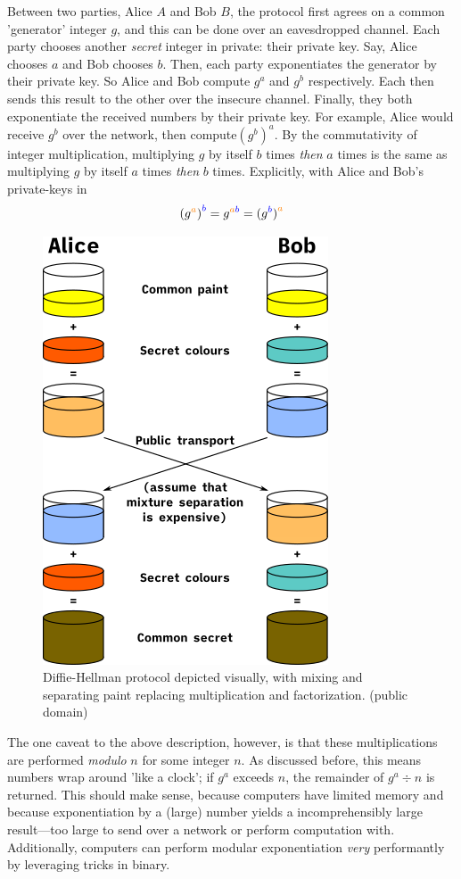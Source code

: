 \documentclass[11pt, a4paper]{report}
\begin{document}
Between two parties, Alice $A$ and Bob $B$, the protocol first agrees on a common 'generator' integer $g$, and this can be done over an eavesdropped channel. Each party chooses another \textit{secret} integer in private: their private key. Say, Alice chooses $a$ and Bob chooses $b$. Then, each party exponentiates the generator by their private key. So Alice and Bob compute $g^a$ and $g^b$ respectively. Each then sends this result to the other over the insecure channel. Finally, they both exponentiate the received numbers by their private key. For example, Alice would receive $g^b$ over the network, then compute$(g^b)^a$.
By the commutativity of integer multiplication, multiplying $g$ by itself $b$ times \textit{then} $a$ times is the same as  multiplying $g$ by itself $a$ times \textit{then} $b$ times. Explicitly, with Alice and Bob's private-keys in \color{orange}{amber} \color{black}{and} \color{blue}{blue} \color{black}{respectively:}
\[ (g^{\color{orange}{a}}\color{black}{)}^{\color{blue}{b}} = g^{\color{orange}{a}\color{blue}{b}} = (g^{\color{blue}{b}}\color{black}{)}^{\color{orange}{a}}  \]

\begin{figure}[ht]
\begin{center}
\includegraphics[width = .4\linewidth]{colors} 
\caption{Diffie-Hellman protocol depicted visually, with mixing and separating paint replacing multiplication and factorization. (public domain)}
\end{center}
\end{figure}

The one caveat to the above description, however, is that these multiplications are performed \textit{modulo} $n$ for some integer $n$. As discussed before, this means numbers wrap around 'like a clock'; if $g^a$ exceeds $n$, the remainder of $g^a \div n$ is returned. This should make sense, because computers have limited memory and because exponentiation by a (large) number yields a incomprehensibly large result—too large to send over a network or perform computation with. Additionally, computers can perform modular exponentiation \textit{very} performantly by leveraging tricks in binary.\autocite{bunimov}
\end{document}
